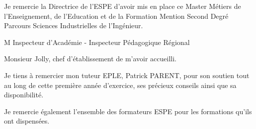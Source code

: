 
Je remercie la Directrice de l'ESPE d'avoir mis en place ce Master Métiers de l'Enseignement, de l'Education et de la Formation Mention Second Degré Parcours Sciences Industrielles de l'Ingénieur.


M Inspecteur d'Académie - Inspecteur Pédagogique Régional


Monsieur Jolly, chef d'établissement de m'avoir accueilli.


Je tiens à remercier mon tuteur EPLE, Patrick PARENT, pour son soutien tout au long de cette première année d'exercice, ses précieux conseils ainsi que sa disponibilité.

Je remercie également l'ensemble des formateurs ESPE pour les formations qu'ils ont dispensées.



